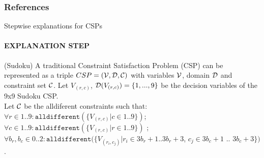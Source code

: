 \documentclass{beamer}
\renewcommand\emph[1]{{\color{vuborange}#1}}
\begin{document}
		
		\begin{frame}[allowframebreaks]
			\frametitle{References}
			
			
		\end{frame}
		
		
			\begin{frame}{Stepwise explanations for CSPs}
			\framesubtitle{EXPLANATION STEP}
			
			\begin{example} (Sudoku) A traditional Constraint Satisfaction Problem (CSP) can be represented as a triple $CSP = ({\cal V},{\cal D},{\cal C})$ with variables ${\cal V}$, domain ${\cal D}$ and constraint set ${\cal C}$. Let $V_{(r, c)}$, ${\cal D}(V_{(r,c)}) = \{1,...,9\}$ be the decision variables of the 9x9 Sudoku CSP.\\ %
				
				
				Let ${\cal C } $ be the alldiferent constraints such that: 
					$\forall r \in 1 .. 9: \mathtt{alldifferent}(\{V_{(r,c)} | c \in 1 .. 9 \} )$; \\
					$\forall c  \in 1 .. 9: \mathtt{alldifferent}(\{V_{(r,c)} | r \in {1 .. 9}\} )$ ; \\
					$\forall b_r, b_c  \in 0 .. 2  : \mathtt{alldifferent}(\{ V_{(r_i ,c_j)} | r_i  \in 3b_r+ 1 .. 3b_r+3$,  $c_j \in 3b_c + 1$ $..$  $3b_c + 3 \} )$.
			\end{example}
		\end{frame}
\end{document}

